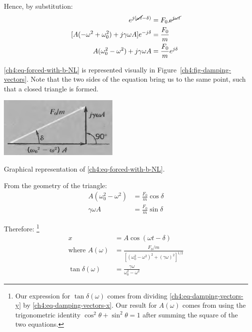 Hence, by substitution:
\begin{align}
	[-m\omega^2 A + j\gamma\omega A + kA] e^{j(\cancel{\omega t} - \delta)} &= F_0 \, \cancel{e^{j\omega t}} \notag \\
	[A(-\omega^2 + \omega_0^2) + j\gamma\omega A] e^{-j\delta} &= \frac{F_0}{m} \notag \\
	A(\omega_0^2 - \omega^2 ) + j\gamma\omega A &= \frac{F_0}{m} e^{j\delta} \label{ch4:eq-forced-with-b-NL}
\end{align}

\eqref{ch4:eq-forced-with-b-NL} is represented visually in Figure~\ref{ch4:fig-damping-vectors}. Note that the two sides of the equation bring us to the same point, such that a closed triangle is formed.

\begin{marginfigure}
	\centering
	\includegraphics[scale=0.65]{phys232/Ch4-forced-damping-vectors.png} \caption{Graphical representation of \eqref{ch4:eq-forced-with-b-NL}.}	\label{ch4:fig-damping-vectors}
\end{marginfigure}

From the geometry of the triangle:
\begin{align}
	A(\omega_0^2 - \omega^2 ) &= \frac{F_0}{m} \cos\delta \label{ch4:eq-damping-vectors-x} \\
	\gamma\omega A &= \frac{F_0}{m} \sin\delta \label{ch4:eq-damping-vectors-y}
\end{align}

Therefore:%
\footnote{Our expression for $\tan\delta(\omega)$ comes from dividing \eqref{ch4:eq-damping-vectors-y} by \eqref{ch4:eq-damping-vectors-x}. Our result for $A(\omega)$ comes from using the trigonometric identity $\cos^2\theta+\sin^2\theta=1$ after summing the square of the two equations.}%
\begin{equation}
\boxed{
	\begin{split}
		x &= A \cos (\omega t - \delta) \\
		\text{where }
		A(\omega) &= \frac{F_0/m}{[(\omega_0^2 - \omega^2)^2 + (\gamma\omega)^2]^{1/2}} \\
		\tan \delta (\omega) &= \frac{\gamma\omega}{\omega_0^2 - \omega^2}
	\end{split}
}
\label{ch4:eq-soln-b}
\end{equation}

